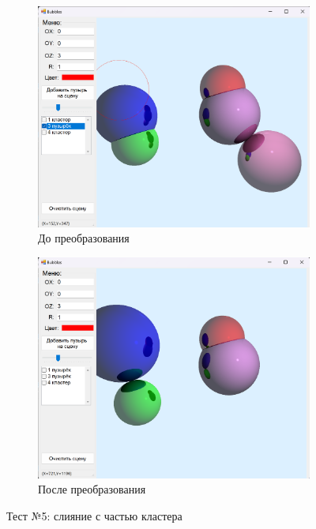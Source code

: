 \begin{figure}[h]
	\centering
	\begin{subfigure}{0.45\textwidth}
		\includegraphics[width=\linewidth]{pictures/test5_1.png}
		\caption{До преобразования}
		\label{fig:5first}
	\end{subfigure}
	\hfill
	\begin{subfigure}{0.45\textwidth}
		\includegraphics[width=\linewidth]{pictures/test5_2.png}
		\caption{После преобразования}
		\label{fig:5second}
	\end{subfigure}
	\caption{Тест №5: слияние с частью кластера}
	\label{fig:test5}
\end{figure}
